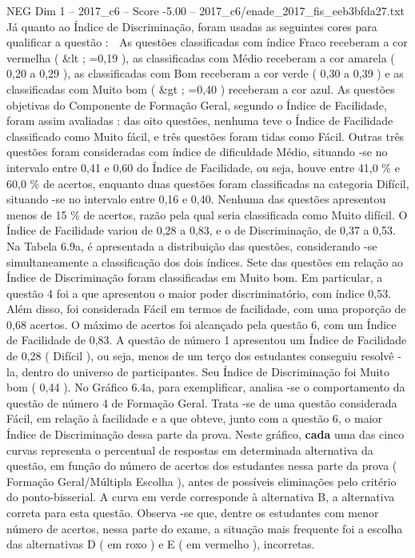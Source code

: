 \begin{textsample}{NEG Dim 1 – 2017\_c6 – Score -5.00 – 2017\_c6/enade\_2017\_fis\_eeb3bfda27.txt}
Já quanto ao Índice de Discriminação, foram usadas as seguintes cores para qualificar a questão :  As questões classificadas com índice Fraco receberam a cor vermelha ( \&lt ; =0,19 ), as classificadas com Médio receberam a cor amarela ( 0,20 a 0,29 ), as classificadas com Bom receberam a cor verde ( 0,30 a 0,39 ) e as classificadas com Muito bom ( \&gt ; =0,40 ) receberam a cor azul.
As questões objetivas do Componente de Formação Geral, segundo o Índice de Facilidade, foram assim avaliadas : das oito questões, nenhuma teve o Índice de Facilidade classificado como Muito fácil, e três questões foram tidas como Fácil.
Outras três questões foram consideradas com índice de dificuldade Médio, situando -se no intervalo entre 0,41 e 0,60 do Índice de Facilidade, ou seja, houve entre 41,0 \% e 60,0 \% de acertos, enquanto duas questões foram classificadas na categoria Difícil, situando -se no intervalo entre 0,16 e 0,40.
Nenhuma das questões apresentou menos de 15 \% de acertos, razão pela qual seria classificada como Muito difícil.
O Índice de Facilidade variou de 0,28 a 0,83, e o de Discriminação, de 0,37 a 0,53.
Na Tabela 6.9a, é apresentada a distribuição das questões, considerando -se simultaneamente a classificação dos dois índices.
Sete das questões em relação ao Índice de Discriminação foram classificadas em Muito bom.
Em particular, a questão 4 foi a que apresentou o maior poder discriminatório, com índice 0,53.
Além disso, foi considerada Fácil em termos de facilidade, com uma proporção de 0,68 acertos.
O máximo de acertos foi alcançado pela questão 6, com um Índice de Facilidade de 0,83.
A questão de número 1 apresentou um Índice de Facilidade de 0,28 ( Difícil ), ou seja, menos de um terço dos estudantes conseguiu resolvê -la, dentro do universo de participantes.
Seu Índice de Discriminação foi Muito bom ( 0,44 ).
No Gráfico 6.4a, para exemplificar, analisa -se o comportamento da questão de número 4 de Formação Geral.
Trata -se de uma questão considerada Fácil, em relação à facilidade e a que obteve, junto com a questão 6, o maior Índice de Discriminação dessa parte da prova.
Neste gráfico, \textbf{cada} uma das cinco curvas representa o percentual de respostas em determinada alternativa da questão, em função do número de acertos dos estudantes nessa parte da prova ( Formação Geral/Múltipla Escolha ), antes de possíveis eliminações pelo critério do ponto-bisserial.
A curva em verde corresponde à alternativa B, a alternativa correta para esta questão.
Observa -se que, dentre os estudantes com menor número de acertos, nessa parte do exame, a situação mais frequente foi a escolha das alternativas D ( em roxo ) e E ( em vermelho ), incorretas.

\end{textsample}
